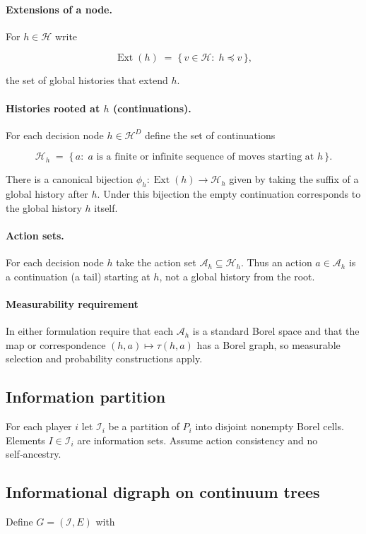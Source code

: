 \documentclass[11pt]{article}
\begin{document}
\paragraph{Extensions of a node.}
For \(h\in\mathcal H\) write


\[
\operatorname{Ext}(h)\;=\;\{\,v\in\mathcal H:\;h\preceq v\,\},
\]


the set of global histories that extend \(h\).

\paragraph{Histories rooted at \(h\) (continuations).}
For each decision node \(h\in\mathcal H^D\) define the set of continuations


\[
\mathcal H_h \;=\; \{\,a:\; a\text{ is a finite or infinite sequence of moves starting at }h\,\}.
\]


There is a canonical bijection \(\phi_h:\operatorname{Ext}(h)\to\mathcal H_h\) given by taking the suffix of a global history after \(h\). Under this bijection the empty continuation corresponds to the global history \(h\) itself.

\paragraph{Action sets.}
For each decision node \(h\) take the action set \(\mathcal A_h\subseteq\mathcal H_h\). Thus an action \(a\in\mathcal A_h\) is a continuation (a tail) starting at \(h\), not a global history from the root.


\paragraph{Measurability requirement}
In either formulation require that each \(\mathcal A_h\) is a standard Borel space and that the map or correspondence \((h,a)\mapsto\tau(h,a)\) has a Borel graph, so measurable selection and probability constructions apply.


\subsection{Information partition}
For each player \(i\) let \(\mathcal I_i\) be a partition of \(P_i\) into
disjoint nonempty Borel cells. Elements \(I\in\mathcal I_i\) are
information sets. Assume action consistency and no self‑ancestry.

\subsection{Informational digraph on continuum trees}
Define \(G=(\mathcal I,E)\) with
\end{document}
